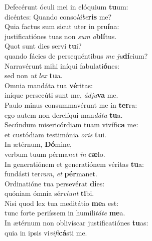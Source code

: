 \evenverse Defecérunt óculi mei in elóquium \textbf{tu}um:~\*\\
\evenverse dicéntes: Quando conso\textit{lá}\textit{be}\textbf{ris} me?\\
\oddverse Quia factus sum sicut uter in pru\textbf{í}na:~\*\\
\oddverse justificatiónes tuas non \textit{sum} \textit{o}\textbf{blí}tus.\\
\evenverse Quot sunt dies servi \textbf{tu}i?~\*\\
\evenverse quando fácies de persequéntibus \textit{me} \textit{ju}\textbf{dí}cium?\\
\oddverse Narravérunt mihi iníqui fabulati\textbf{ó}nes:~\*\\
\oddverse sed non \textit{ut} \textit{lex} \textbf{tu}a.\\
\evenverse Omnia mandáta tua \textbf{vé}ritas:~\*\\
\evenverse iníque persecúti sunt me, \textit{ád}\textit{ju}\textbf{va} me.\\
\oddverse Paulo minus consummavérunt me in \textbf{ter}ra:~\*\\
\oddverse ego autem non derelíqui man\textit{dá}\textit{ta} \textbf{tu}a.\\
\evenverse Secúndum misericórdiam tuam vivífi\textbf{ca} me:~\*\\
\evenverse et custódiam testimónia \textit{o}\textit{ris} \textbf{tu}i.\\
\oddverse In ætérnum, \textbf{Dó}mine,~\*\\
\oddverse verbum tuum pérma\textit{net} \textit{in} \textbf{cæ}lo.\\
\evenverse In generatiónem et generatiónem véritas \textbf{tu}a:~\*\\
\evenverse fundásti ter\textit{ram}, \textit{et} \textbf{pér}manet.\\
\oddverse Ordinatióne tua persevérat \textbf{di}es:~\*\\
\oddverse quóniam ómnia sér\textit{vi}\textit{unt} \textbf{ti}bi.\\
\evenverse Nisi quod lex tua meditátio \textbf{me}a est:~\*\\
\evenverse tunc forte periíssem in humili\textit{tá}\textit{te} \textbf{me}a.\\
\oddverse In ætérnum non oblivíscar justificatiónes \textbf{tu}as:~\*\\
\oddverse quia in ipsis vi\textit{vi}\textit{fi}\textbf{cá}sti me.\\
